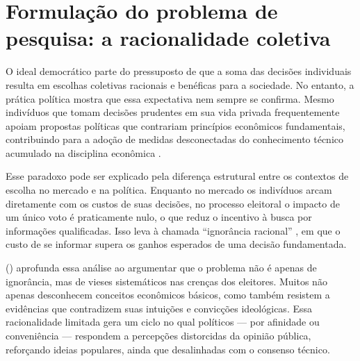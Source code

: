 
\section{Formulação do problema de pesquisa: a racionalidade coletiva} %


O ideal democrático parte do pressuposto de que a soma das decisões individuais resulta em escolhas coletivas racionais e benéficas para a sociedade. No entanto, a prática política mostra que essa expectativa nem sempre se confirma. Mesmo indivíduos que tomam decisões prudentes em sua vida privada frequentemente apoiam propostas políticas que contrariam princípios econômicos fundamentais, contribuindo para a adoção de medidas desconectadas do conhecimento técnico acumulado na disciplina econômica \cite{downs1957economic,The_Myth_of_the_Rational_Voter}.

Esse paradoxo pode ser explicado pela diferença estrutural entre os contextos de escolha no mercado e na política. Enquanto no mercado os indivíduos arcam diretamente com os custos de suas decisões, no processo eleitoral o impacto de um único voto é praticamente nulo, o que reduz o incentivo à busca por informações qualificadas. Isso leva à chamada “ignorância racional” \cite{downs1957economic}, em que o custo de se informar supera os ganhos esperados de uma decisão fundamentada.

 (\citeyear{The_Myth_of_the_Rational_Voter}) aprofunda essa análise ao argumentar que o problema não é apenas de ignorância, mas de vieses sistemáticos nas crenças dos eleitores. Muitos não apenas desconhecem conceitos econômicos básicos, como também resistem a evidências que contradizem suas intuições e convicções ideológicas. Essa racionalidade limitada gera um ciclo no qual políticos — por afinidade ou conveniência — respondem a percepções distorcidas da opinião pública, reforçando ideias populares, ainda que desalinhadas com o consenso técnico.

